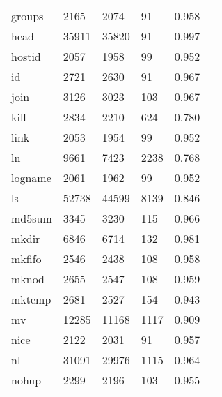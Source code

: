 \begin{longtable}{lp{2.20cm}p{2.20cm}p{2.20cm}p{2.20cm}p{2.20cm}}
groups    &                     2165 &         2074 &            91 &                    0.958 \\
head      &                    35911 &        35820 &            91 &                    0.997 \\
hostid    &                     2057 &         1958 &            99 &                    0.952 \\
id        &                     2721 &         2630 &            91 &                    0.967 \\
join      &                     3126 &         3023 &           103 &                    0.967 \\
kill      &                     2834 &         2210 &           624 &                    0.780 \\
link      &                     2053 &         1954 &            99 &                    0.952 \\
ln        &                     9661 &         7423 &          2238 &                    0.768 \\
logname   &                     2061 &         1962 &            99 &                    0.952 \\
ls        &                    52738 &        44599 &          8139 &                    0.846 \\
md5sum    &                     3345 &         3230 &           115 &                    0.966 \\
mkdir     &                     6846 &         6714 &           132 &                    0.981 \\
mkfifo    &                     2546 &         2438 &           108 &                    0.958 \\
mknod     &                     2655 &         2547 &           108 &                    0.959 \\
mktemp    &                     2681 &         2527 &           154 &                    0.943 \\
mv        &                    12285 &        11168 &          1117 &                    0.909 \\
nice      &                     2122 &         2031 &            91 &                    0.957 \\
nl        &                    31091 &        29976 &          1115 &                    0.964 \\
nohup     &                     2299 &         2196 &           103 &                    0.955 \\

\end{longtable}
